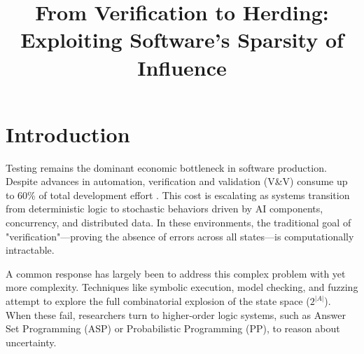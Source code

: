 \documentclass[pdflatex,sn-basic]{sn-jnl}
\begin{document}
\title[From Verification to Herding]{From Verification to Herding:
Exploiting Software's Sparsity of Influence}

\author*[1]{ }
\author[1]{ }



\maketitle

\section{Introduction}
Testing remains the dominant economic bottleneck in software production. 
Despite advances in automation, verification and validation (V\&V) consume up 
to 60\% of total development effort \citep{Long24}. This cost is escalating as 
systems transition from deterministic logic to stochastic behaviors driven by 
AI components, concurrency, and distributed data. In these environments, the 
traditional goal of "verification"---proving the absence of errors across all 
states---is computationally intractable.

A common response has largely been to address this complex problem with yet more    complexity. 
Techniques like symbolic execution, model checking, and fuzzing attempt to 
explore the full combinatorial explosion of the state space ($2^{|A|}$). When 
these fail, researchers turn to higher-order logic systems, such as Answer Set 
Programming (ASP) or Probabilistic Programming (PP), to reason about uncertainty.
\end{document}
